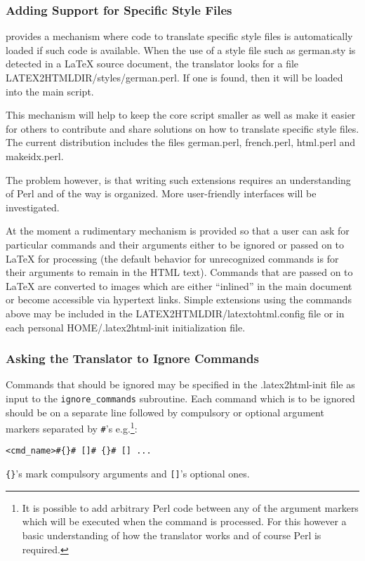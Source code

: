 \subsubsection{Adding Support for Specific Style Files}
\label{sec:sty}
\latextohtml provides a mechanism where code to translate specific
style files is automatically loaded if such code is available.
When the use of a style
file such as {\fn german.sty} is detected in a LaTeX source
document,
the translator looks for a file {\fn LATEX2HTMLDIR/styles/german.perl}.
If one is found, then it will be loaded into the main script. 

This mechanism will help to keep the core script smaller as well as make
it easier for others to contribute and share solutions on  
how to translate specific style files. The current distribution includes the files
{\fn german.perl}, {\fn french.perl}, {\fn html.perl} and {\fn makeidx.perl}.

The problem however, is that writing such extensions requires an understanding 
of Perl and of the way \latextohtml is organized. More user-friendly 
interfaces will be  investigated.

At the moment a rudimentary mechanism is provided so that 
a user can ask for particular commands and their arguments either to be
ignored or passed on to LaTeX for processing (the default behavior
for unrecognized commands is for their arguments to remain in the HTML
text).
Commands that are passed on to LaTeX are converted to images which
are either ``inlined'' in the main document or become accessible via
hypertext links.
Simple extensions using the commands above may be included in the 
{\fn LATEX2HTMLDIR/latextohtml.config} file or in each personal 
{\fn HOME/.latex2html-init} initialization file.

\subsubsection{Asking the Translator to Ignore Commands}
Commands that should be ignored may be specified in the {\fn
.latex2html-init}
file as input to the {\tt {\verb|ignore_commands|}} subroutine. 
Each command which is to be ignored should be on a separate line 
followed by compulsory or optional argument markers separated by 
{\verb|#|}'s e.g.\footnote{It is possible to add arbitrary Perl code
between any of the argument markers which will be executed when 
the command is processed. For this however a basic understanding of
how the translator works and of course Perl is required.}:
\begin{verbatim}
<cmd_name>#{}# []# {}# [] ...
\end{verbatim} 
\verb|{}|'s mark compulsory arguments and \verb|[]|'s optional ones.

